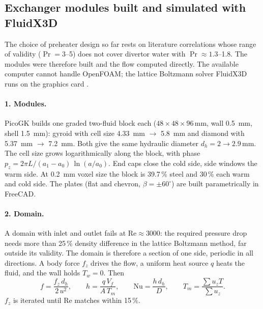 \subsection{Exchanger modules built and simulated with FluidX3D}\label{sec:exchangercfd}
The choice of preheater design so far rests on literature correlations whose range of validity ($\Pr = 3$--5)
does not cover divertor water with $\Pr \approx 1.3$--1.8. The modules were therefore built and the flow computed
directly. The available computer cannot handle OpenFOAM; the lattice Boltzmann solver FluidX3D runs on the
graphics card \cite{fluidx3d,lehmann2022fp}.

\paragraph{1. Modules.} PicoGK builds one graded two-fluid block each ($48\times48\times96$\,mm, wall \SI{0.5}{mm},
shell \SI{1.5}{mm}): gyroid with cell size \SI{4.33}{mm} $\to$ \SI{5.8}{mm} and diamond with \SI{5.37}{mm} $\to$
\SI{7.2}{mm}. Both give the same hydraulic diameter $d_h = 2 \to 2.9$\,mm. The cell size grows logarithmically
along the block, with phase $p_z = 2\pi L/(a_1 - a_0)\,\ln(a/a_0)$. End caps close the cold side, side windows the
warm side. At \SI{0.2}{mm} voxel size the block is 39.7\,\% steel and 30\,\% each warm and cold side. The plates
(flat and chevron, $\beta = \pm 60^\circ$) are built parametrically in FreeCAD.



\paragraph{2. Domain.} A domain with inlet and outlet fails at $\mathrm{Re}\approx3000$: the required pressure drop
needs more than 25\,\% density difference in the lattice Boltzmann method, far outside its validity. The domain is
therefore a section of one side, periodic in all directions. A body force $f_z$ drives the flow, a uniform heat
source $q$ heats the fluid, and the wall holds $T_w=0$. Then
\[
f = \frac{f_z\,d_h}{2\,u^2},\qquad h = \frac{q\,V_f}{A\,T_m},\qquad \mathrm{Nu} = \frac{h\,d_h}{D},\qquad
T_m = \frac{\sum u_z T}{\sum u_z}.
\]
$f_z$ is iterated until Re matches within 15\,\%.

